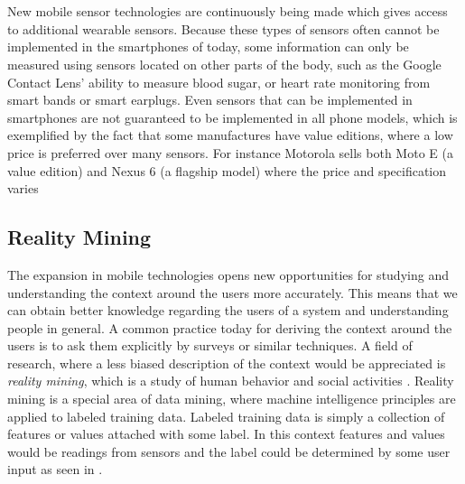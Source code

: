 \\\\
New mobile sensor technologies are continuously being made which gives access to additional wearable sensors. Because these types of sensors often cannot be implemented in the smartphones of today, some information can only be measured using sensors located on other parts of the body, such as the Google Contact Lens' ability to measure blood sugar, or heart rate monitoring from smart bands or smart earplugs. Even sensors that can be implemented in smartphones are not guaranteed to be implemented in all phone models, which is exemplified by the fact that some manufactures have value editions, where a low price is preferred over many sensors. For instance Motorola sells both Moto E (a value edition) and Nexus 6 (a flagship model) where the price and specification varies \parencite{moto_e_compared_to_nexus_6}

\subsection{Reality Mining}
\label{sub:reality_mining}
The expansion in mobile technologies opens new opportunities for studying and understanding the context around the users more accurately. This means that we can obtain better knowledge regarding the users of a system and understanding people in general. A common practice today for deriving the context around the users is to ask them explicitly by surveys or similar techniques. A field of research, where a less biased description of the context would be appreciated is \emph{reality mining}, which is a study of human behavior and social activities \parencite{madan2009_reality_mining_privacy}. Reality mining is a special area of data mining, where machine intelligence principles are applied to labeled training data. Labeled training data is simply a collection of features or values attached with some label. In this context features and values would be readings from sensors and the label could be determined by some user input as seen in .

